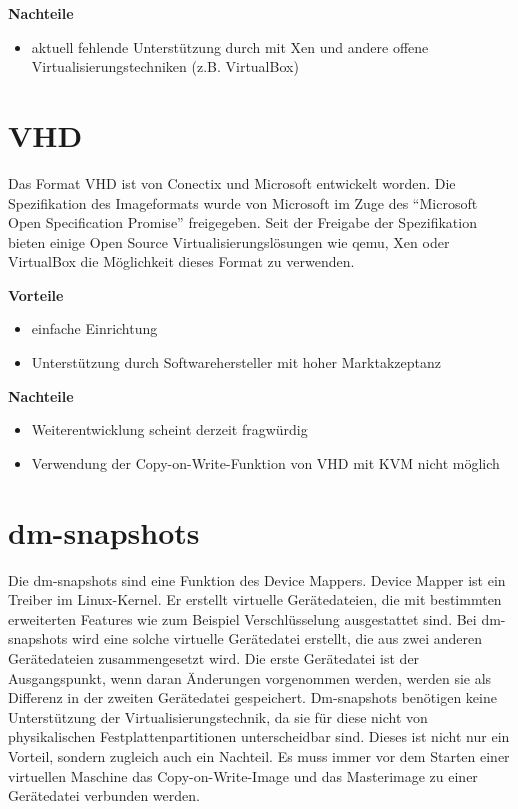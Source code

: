 \textbf{Nachteile}
\begin{itemize}
 \item aktuell fehlende Unterstützung durch mit Xen und andere offene Virtualisierungstechniken (z.B. VirtualBox)
\end{itemize}

\section{VHD}
Das Format VHD ist von Conectix und Microsoft entwickelt worden. Die Spezifikation des Imageformats wurde von Microsoft im Zuge des ``Microsoft Open Specification Promise'' freigegeben. Seit der Freigabe der Spezifikation bieten einige Open Source Virtualisierungslösungen wie qemu, Xen oder VirtualBox die Möglichkeit dieses Format zu verwenden. \cite{msosp} \cite{vhdspec} %

\textbf{Vorteile}
\begin{itemize}
 \item einfache Einrichtung
 \item Unterstützung durch Softwarehersteller mit hoher Marktakzeptanz
\end{itemize}

\textbf{Nachteile}
\begin{itemize}
 \item Weiterentwicklung scheint derzeit fragwürdig
 \item Verwendung der Copy-on-Write-Funktion von VHD mit KVM nicht möglich
\end{itemize}

\section{dm-snapshots}
Die dm-snapshots sind eine Funktion des Device Mappers. Device Mapper ist ein Treiber im Linux-Kernel. Er erstellt virtuelle Gerätedateien, die mit bestimmten erweiterten Features wie zum Beispiel Verschlüsselung ausgestattet sind. Bei dm-snapshots wird eine solche virtuelle Gerätedatei erstellt, die aus zwei anderen Gerätedateien zusammengesetzt wird. Die erste Gerätedatei ist der Ausgangspunkt, wenn daran Änderungen vorgenommen werden, werden sie als Differenz in der zweiten Gerätedatei gespeichert. Dm-snapshots benötigen keine Unterstützung der Virtualisierungstechnik, da sie für diese nicht von physikalischen Festplattenpartitionen unterscheidbar sind. Dieses ist nicht nur ein Vorteil, sondern zugleich auch ein Nachteil. Es muss immer vor dem Starten einer virtuellen Maschine das Copy-on-Write-Image und das Masterimage zu einer Gerätedatei verbunden werden. \cite{dmmbroz} \cite{dmkerneldoc}

